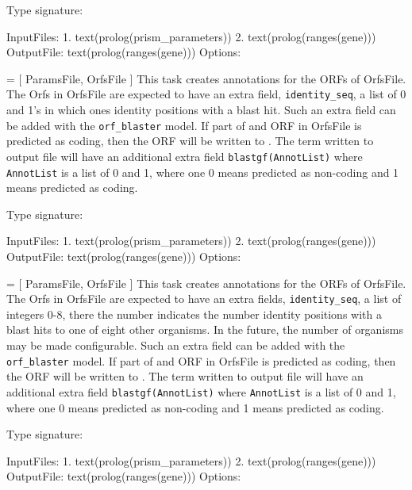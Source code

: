 \begin{description}
Type signature:

\begin{code}
InputFiles:
    1. text(prolog(prism_parameters))
    2. text(prolog(ranges(gene)))
OutputFile:
    text(prolog(ranges(gene)))
Options:
\end{code}

 = [ ParamsFile, OrfsFile ]
This task creates annotations for the ORFs of OrfsFile.
The Orfs in OrfsFile are expected to have an extra field, \verb$identity_seq$, a list of 0 and 1's in which ones identity positions with a blast hit.
Such an extra field can be added with the \verb$orf_blaster$ model.
If part of and ORF in OrfsFile is predicted as coding, then the ORF will be written to .
The term written to output file will have an additional extra field \verb$blastgf(AnnotList)$ where \verb$AnnotList$ is a list of 0 and 1, where one 0 means predicted as non-coding and 1 means predicted as coding.

Type signature:

\begin{code}
InputFiles:
    1. text(prolog(prism_parameters))
    2. text(prolog(ranges(gene)))
OutputFile:
    text(prolog(ranges(gene)))
Options:
\end{code}

 = [ ParamsFile, OrfsFile ]
This task creates annotations for the ORFs of OrfsFile.
The Orfs in OrfsFile are expected to have an extra fields, \verb$identity_seq$, a list of integers 0-8, there the number indicates the number identity positions with a blast hits to one of eight other organisms.
In the future, the number of organisms may be made configurable.
Such an extra field can be added with the \verb$orf_blaster$ model.
If part of and ORF in OrfsFile is predicted as coding, then the ORF will be written to .
The term written to output file will have an additional extra field \verb$blastgf(AnnotList)$ where \verb$AnnotList$ is a list of 0 and 1, where one 0 means predicted as non-coding and 1 means predicted as coding.

Type signature:

\begin{code}
InputFiles:
    1. text(prolog(prism_parameters))
    2. text(prolog(ranges(gene)))
OutputFile:
    text(prolog(ranges(gene)))
Options:
\end{code}


\end{description}
